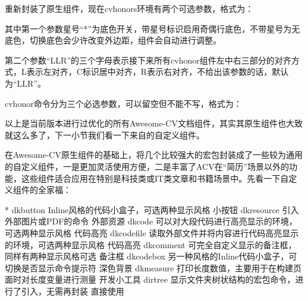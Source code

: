 \begin{cventries}
{    \item {\dk}重新封装了原生组件，现在cvhonors环境有两个可选参数，格式为：
    \begin{center}
    \end{center}
    \item 其中第一个参数星号“*”为底色开关，带星号标识启用奇偶行底色，不带星号为无底色，切换底色会少许改变外边距，组件会自动进行调整。
    \item 第二个参数“LLR”的三个字母表示接下来所有cvhonor组件左中右三部分的对齐方式，L表示左对齐，C标识居中对齐，R表示右对齐，不给出该参数的话，默认为“LLR”。
    \item cvhonor命令分为三个必选参数，可以留空但不能不写，格式为：
    \begin{center}
    \end{center}
  }
\end{cventries}

以上是{\dk}当前版本进行过优化的所有Awesome-CV文档组件，其实其原生组件也大致就这么多了，下一小节我们看一下来自{\dk}的自定义组件。

在Awesome-CV原生组件的基础上，{\dk}将几个比较强大的宏包封装成了一些较为通用的自定义组件，一是更加灵活使用方便，二是丰富了ACV在“简历”场景以外的功能，这些组件适合应用在特别是科技类或IT类文章和书籍场景中。先看一下{\dk}自定义组件的全家福：

\begin{cvhonors}*
  \cvhonor
    {dkbutton}
    {Inline风格的代码小盒子，可选两种显示风格}
    {小按钮}
  \cvhonor
    {dkresource}
    {引入外部图片或PDF的命令}
    {外部资源}
  \cvhonor
    {dkcode}
    {可以对大段代码进行高亮显示的环境，可选两种显示风格}
    {代码高亮}
  \cvhonor
    {dkcodefile}
    {读取外部文件并将内容进行代码高亮显示的环境，可选两种显示风格}
    {代码高亮}
  \cvhonor
    {dkcomment}
    {可完全自定义显示的备注框，同样有两种显示风格可选}
    {备注框}
  \cvhonor
    {dkcodebox}
    {另一种风格的Inline代码小盒子，可切换是否显示命令提示符}
    {深色背景}
  \cvhonor
    {dkmeasure}
    {打印长度数值，主要用于在构建页面时对长度变量进行测量}
    {开发小工具}
  \cvhonor
    {dirtree}
    {显示文件夹树状结构的宏包命令，{\dk}进行了引入，无需再封装}
    {直接使用}
\end{cvhonors}

